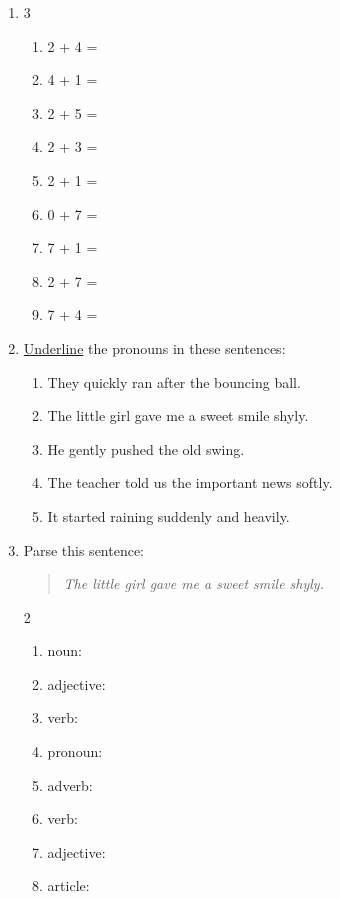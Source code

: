 \documentclass{tufte-book}
\begin{document}
\begin{enumerate}
  \item
  \begin{multicols}{3}
    \begin{enumerate}\bigskip
      \item 2 + 4 = \dotfill\bigskip
      \item 4 + 1 = \dotfill\bigskip
      \item 2 + 5 = \dotfill
      \item 2 + 3 = \dotfill\bigskip
      \item 2 + 1 = \dotfill\bigskip
      \item 0 + 7 = \dotfill
      \item 7 + 1 = \dotfill\bigskip
      \item 2 + 7 = \dotfill\bigskip
      \item 7 + 4 = \dotfill
    \end{enumerate}
  \end{multicols}

  \item \underline{Underline} the pronouns in these sentences:
  \begin{enumerate}
    \item They quickly ran after the bouncing ball.
    \item The little girl gave me a sweet smile shyly.
    \item He gently pushed the old swing.
    \item The teacher told us the important news softly.
    \item It started raining suddenly and heavily.
  \end{enumerate}
  
  \item Parse this sentence:
  \begin{quote}
    \textit{The little girl gave me a sweet smile shyly.}
  \end{quote}
  \begin{multicols}{2}
  \begin{enumerate}\bigskip
    \item noun: \dotfill\bigskip
    \item adjective: \dotfill\bigskip
    \item verb: \dotfill\bigskip
    \item pronoun: \dotfill
    \item adverb: \dotfill\bigskip
    \item verb: \dotfill\bigskip
    \item adjective: \dotfill\bigskip
    \item article: \dotfill
  \end{enumerate}
  \end{multicols}


\end{enumerate}
\end{document}
